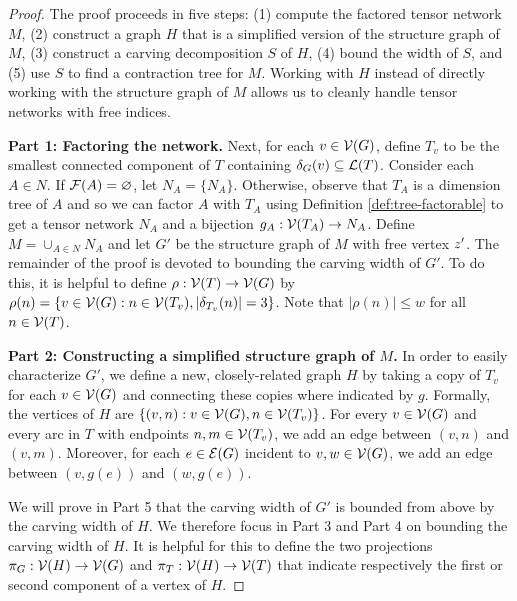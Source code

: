 \begin{proof}
The proof proceeds in five steps: (1) compute the factored tensor network $M$, (2) construct a graph $H$ that is a simplified version of the structure graph of $M$, (3) construct a carving decomposition $S$ of $H$, (4) bound the width of $S$, and (5) use $S$ to find a contraction tree for $M$. Working with $H$ instead of directly working with the structure graph of $M$ allows us to cleanly handle tensor networks with free indices.

\textbf{Part 1: Factoring the network.}
Next, for each $v \in \mathcal{V}(G)$, define $T_v$ to be the smallest connected component of $T$ containing $\delta_{G}(v) \subseteq \mathcal{L}(T)$. Consider each $A \in N$. If $\mathcal{F}(A) = \varnothing$, let $N_A = \{N_A\}$. Otherwise, observe that $T_A$ is a dimension tree of $A$ and so we can factor $A$ with $T_A$ using Definition \ref{def:tree-factorable} to get a tensor network $N_A$ and a bijection $g_A: \mathcal{V}(T_A) \rightarrow N_A$. Define $M = \cup_{A \in N} N_A$ and let $G'$ be the structure graph of $M$ with free vertex $z'$. The remainder of the proof is devoted to bounding the carving width of $G'$. To do this, it is helpful to define $\rho: \mathcal{V}(T) \rightarrow \mathcal{V}(G)$ by $\rho(n) = \{ v \in \mathcal{V}(G) : n \in \mathcal{V}(T_v), |\delta_{T_v}(n)| = 3\}$. Note that $|\rho(n)| \leq w$ for all $n \in \mathcal{V}(T)$.

\textbf{Part 2: Constructing a simplified structure graph of $M$.} In order to easily characterize $G'$, we define a new, closely-related graph $H$ by taking a copy of $T_v$ for each $v \in \mathcal{V}(G)$ and connecting these copies where indicated by $g$. Formally, the vertices of $H$ are $\{(v, n) : v \in \mathcal{V}(G), n \in \mathcal{V}(T_v)\}$. For every $v \in \mathcal{V}(G)$ and every arc in $T$ with endpoints $n, m \in \mathcal{V}(T_v)$, we add an edge between $(v, n)$ and $(v, m)$. Moreover, for each $e \in \mathcal{E}(G)$ incident to $v, w \in \mathcal{V}(G)$, we add an edge between $(v, g(e))$ and $(w, g(e))$. 

We will prove in Part 5 that the carving width of $G'$ is bounded from above by the carving width of $H$. We therefore focus in Part 3 and Part 4 on bounding the carving width of $H$. It is helpful for this to define the two projections $\pi_G : \mathcal{V}(H) \rightarrow \mathcal{V}(G)$ and $\pi_T : \mathcal{V}(H) \rightarrow \mathcal{V}(T)$ that indicate respectively the first or second component of a vertex of $H$. 



\end{proof}
